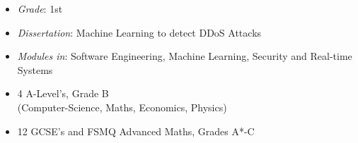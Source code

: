\documentclass[10pt,a4paper,ragged2e]{maltacv}
\begin{document}
\begin{multicols}{4}

\end{multicols}

\bigskip
{}
\bigskip
\begin{multicols}{2}

  \begin{itemize}
      \item \textit{Grade}: 1st
      \item \textit{Dissertation}: Machine Learning to detect DDoS Attacks
      \item \textit{Modules in}: Software Engineering, Machine Learning, Security and Real-time Systems
  \end{itemize}

  \begin{itemize}
      \item 4 A-Level’s, Grade B \\ (Computer-Science, Maths,  Economics, Physics)
      \item 12 GCSE’s and FSMQ Advanced Maths, Grades A*-C
  \end{itemize}
  \hspace{0pt}
\end{multicols}
\end{document}
